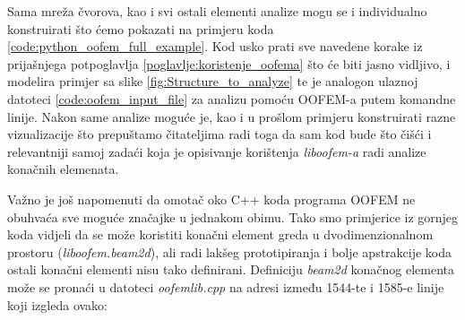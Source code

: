 \documentclass[a4paper,twoside,12pt]{memoir} %
\begin{document}
Sama mreža čvorova, kao i svi ostali elementi analize mogu se i individualno konstruirati što ćemo pokazati na primjeru koda \ref{code:python_oofem_full_example}. Kod usko prati sve navedene korake iz prijašnjega potpoglavlja \ref{poglavlje:koristenje_oofema} što će biti jasno vidljivo, i modelira primjer sa slike \ref{fig:Structure_to_analyze} te je analogon ulaznoj datoteci \ref{code:oofem_input_file} za analizu pomoću OOFEM-a putem komandne linije. Nakon same analize moguće je, kao i u prošlom primjeru konstruirati razne vizualizacije što prepuštamo čitateljima radi toga da sam kod bude što čišći i relevantniji samoj zadaći koja je opisivanje korištenja \textit{liboofem-a} radi analize konačnih elemenata.



Važno je još napomenuti da omotač oko C++ koda programa OOFEM ne obuhvaća sve moguće značajke u jednakom obimu. Tako smo primjerice iz gornjeg koda vidjeli da se može koristiti konačni element greda u dvodimenzionalnom prostoru (\textit{liboofem.beam2d}), ali radi lakšeg prototipiranja i bolje apstrakcije koda ostali konačni elementi nisu tako definirani. Definiciju \textit{beam2d} konačnog elementa može se pronaći u datoteci \textit{oofemlib.cpp} na adresi \cite{oofemlib_source} između 1544-te i 1585-e linije koji izgleda ovako:
\end{document}
